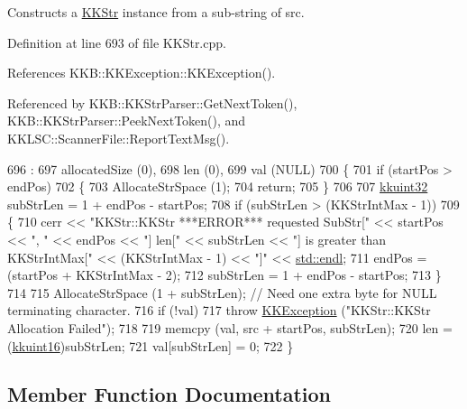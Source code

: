 Constructs a \hyperlink{class_k_k_b_1_1_k_k_str}{K\+K\+Str} instance from a sub-\/string of \textquotesingle{}src\textquotesingle{}. 



Definition at line 693 of file K\+K\+Str.\+cpp.



References K\+K\+B\+::\+K\+K\+Exception\+::\+K\+K\+Exception().



Referenced by K\+K\+B\+::\+K\+K\+Str\+Parser\+::\+Get\+Next\+Token(), K\+K\+B\+::\+K\+K\+Str\+Parser\+::\+Peek\+Next\+Token(), and K\+K\+L\+S\+C\+::\+Scanner\+File\+::\+Report\+Text\+Msg().


\begin{DoxyCode}
696               :
697         allocatedSize (0),
698         len (0),
699         val (NULL)
700 \{
701   \textcolor{keywordflow}{if}  (startPos > endPos)
702   \{
703     AllocateStrSpace (1);
704     \textcolor{keywordflow}{return};
705   \}
706 
707   \hyperlink{namespace_k_k_b_af8d832f05c54994a1cce25bd5743e19a}{kkuint32}  subStrLen = 1 + endPos - startPos;
708   \textcolor{keywordflow}{if}  (subStrLen > (KKStrIntMax - 1))
709   \{
710     cerr << \textcolor{stringliteral}{"KKStr::KKStr   ***ERROR***  requested SubStr["} << startPos << \textcolor{stringliteral}{", "} << endPos << \textcolor{stringliteral}{"]  len["} << 
      subStrLen << \textcolor{stringliteral}{"] is greater than KKStrIntMax["} << (KKStrIntMax - 1) << \textcolor{stringliteral}{"]"} << 
      \hyperlink{namespace_k_k_b_ad1f50f65af6adc8fa9e6f62d007818a8}{std::endl};
711     endPos = (startPos + KKStrIntMax - 2);
712     subStrLen = 1 + endPos - startPos;
713   \}
714 
715   AllocateStrSpace (1 + subStrLen);             \textcolor{comment}{// Need one extra byte for NULL terminating character.}
716   \textcolor{keywordflow}{if}  (!val)
717     \textcolor{keywordflow}{throw} \hyperlink{class_k_k_b_1_1_k_k_exception}{KKException} (\textcolor{stringliteral}{"KKStr::KKStr   Allocation Failed"});
718 
719   memcpy (val, src + startPos, subStrLen);
720   len = (\hyperlink{namespace_k_k_b_aa8c7d4d30381c8a0b6fce68974a9c8a9}{kkuint16})subStrLen;
721   val[subStrLen] = 0;
722 \}
\end{DoxyCode}


\subsection{Member Function Documentation}
